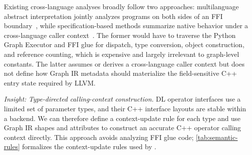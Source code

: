 Existing cross-language analyses broadly follow two approaches: multilanguage abstract interpretation jointly analyzes programs on both sides of an FFI boundary~\cite{Monat2021PythonC}, while specification-based methods summarize native behavior under a cross-language caller context~\cite{kan2024taint4javac}.
The former would have to traverse the Python Graph Executor and FFI glue for dispatch, type conversion, object construction, and reference counting, which is expensive and largely irrelevant to graph-level constants.
The latter assumes or derives a cross-language caller context but does not define how Graph IR metadata should materialize the field-sensitive C++ entry state required by LLVM.

\textit{Insight: Type-directed calling-context construction.}
DL operator interfaces use a limited set of parameter types, and their C++ interface layouts are stable within a backend.
We can therefore define a context-update rule for each type and use Graph IR shapes and attributes to construct an accurate C++ operator calling context directly.
This approach avoids analyzing FFI glue code; \autoref{tab:semantic-rules} formalizes the context-update rules used by \mysys.


